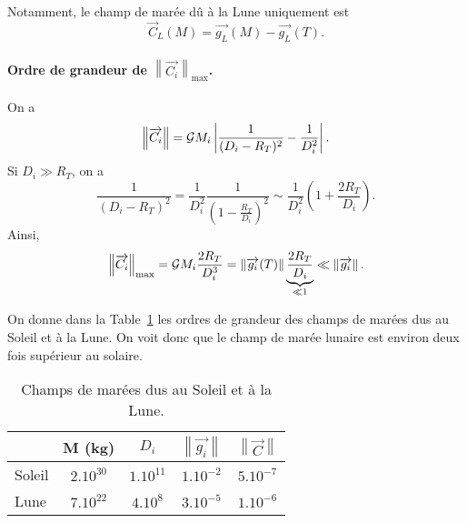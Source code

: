         Notamment, le champ de marée dû à la Lune uniquement est
        \begin{equation*}
            \vec{C}_L(M)=\vec{g_L}(M)-\vec{g_L}(T).
        \end{equation*}

        \paragraph{Ordre de grandeur de $\left\lVert\vec{C_i}\right\rVert_{\text{max}}$.} 
            On a 
            \begin{equation*}
                \left\lVert \protect\overrightarrow{{C_i}}\right\rVert=\mathcal{G} M_i\left\lvert\frac{1}{(D_i-R_T)^{2}}-\frac{1}{D_i^{2}}\right\rvert.
            \end{equation*}
            Si $D_i\gg R_T$, on a 
            \begin{equation*}
                \frac{1}{(D_i-R_T)^{2}}=\frac{1}{D_i^{2}}\frac{1}{\left(1-\frac{R_T}{D_i}\right)^{2}}\sim\frac{1}{D_i^{2}}\left(1+\frac{2R_T}{D_i}\right).
            \end{equation*}
            Ainsi,
            \begin{equation*}
                \left\lVert \protect\overrightarrow{{C_i}}\right\rVert_{\text{max}}=\mathcal{G} M_i\frac{2R_T}{D_i^{3}}=\left\lVert\protect\overrightarrow{{g_i}}(T)\right\rVert\underbrace{\frac{2R_T}{D_i}}_{\ll1}\ll\left\lVert \protect\overrightarrow{{g_i}}\right\rVert.
            \end{equation*}
            
            On donne dans la Table~\ref{tab:champ_maree_soleil_lune} les ordres de grandeur des champs de marées dus au Soleil et à la Lune. On voit donc que le champ de marée lunaire est environ deux fois supérieur au solaire.
            
            \begin{table}
                \centering
                \begin{tabular}{l|c|c|c|c}
                    \toprule
                    & M (kg) & $D_i$ & $\left\lVert \vec{g_i}\right\rVert$ & $\left\lVert\vec{C}\right\rVert$\\ \midrule
                    Soleil & $2.10^{30}$ & $1.10^{11}$ & $1.10^{-2}$ & $5.10^{-7}$\\ \midrule
                    Lune & $7.10^{22}$ & $4.10^{8}$ & $3.10^{-5}$ & $1.10^{-6}$\\ \bottomrule
                \end{tabular}    
                \caption{Champs de marées dus au Soleil et à la Lune.}
                \label{tab:champ_maree_soleil_lune}
            \end{table}
        
